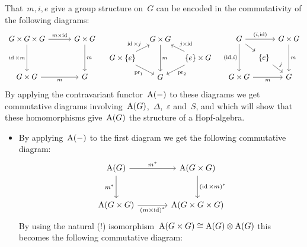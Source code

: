 \begin{fluff}
  That~$m, i, e$ give a group structure on~$G$ can be encoded in the commutativity of the following diagrams:
  \[
    \begin{tikzcd}[column sep = 30pt, row sep = 35pt]
        G \times G \times G
        \arrow{r}[above]{m \times \id}
        \arrow{d}[left]{\id \times m}
      & G \times G
        \arrow{d}[right]{m}
      \\
        G \times G
        \arrow{r}[below]{m}
      & G
    \end{tikzcd}
    \quad
    \begin{tikzcd}[column sep = 10pt, row sep = 9pt]
        {}
      & G \times G
        \arrow{dd}[right]{m}
      & {}
      \\
        G \times \{e\}
        \arrow{ur}[above left]{\id \times j}
        \arrow{dr}[below left]{\pr_1}
      & {}
      & \{e\} \times G
        \arrow{ul}[above right]{j \times \id}
        \arrow{dl}[below right]{\pr_2}
      \\
        {}
      & G
      & {}
    \end{tikzcd}
    \quad
    \begin{tikzcd}[column sep = 3pt, row sep = 9pt]
        G
        \arrow{rr}[above]{(i,\id)}
        \arrow{dd}[left]{(\id,i)}
        \arrow{dr}
      & {}
      & G \times G
        \arrow{dd}[right]{m}
      \\
        {}
      & \{e\}
        \arrow{dr}{j}
      & {}
      \\
        G \times G
        \arrow{rr}[below]{m}
      & {}
      & G
    \end{tikzcd}
  \]
  By applying the contravariant functor~$\operatorname{A}(-)$ to these diagrams we get commutative diagrams involving~$\operatorname{A}(G)$,~$\Delta$,~$\varepsilon$ and~$S$, and which will show that these homomorphisms give~$\operatorname{A}(G)$ the structure of a Hopf-algebra.
  \begin{itemize}
    \item
      By applying~$\operatorname{A}(-)$ to the first diagram we get the following commutative diagram:
      \[
        \begin{tikzcd}[sep = large]
            \coord(G)
            \arrow{r}[above]{m^*}
            \arrow{d}[left]{m^*}
          & \coord(G \times G)
            \arrow{d}[right]{(\id \times m)^*}
          \\
            \coord(G \times G)
            \arrow{r}[below]{(m \times \id)^*}
          & \coord(G \times G \times G)
        \end{tikzcd}
      \]
      By using the natural (!) isomorphism~$\operatorname{A}(G \times G) \cong \operatorname{A}(G) \otimes \operatorname{A}(G)$ this becomes the following commutative diagram:

\end{itemize}
\end{fluff}
